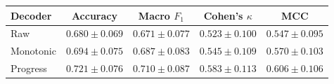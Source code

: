 \begin{tabular}{lcccc}
\toprule
Decoder & Accuracy & Macro $F_1$ & Cohen's $\kappa$ & MCC \\
\midrule
Raw & $0.680 \pm 0.069$ & $0.671 \pm 0.077$ & $0.523 \pm 0.100$ & $0.547 \pm 0.095$ \\
Monotonic & $0.694 \pm 0.075$ & $0.687 \pm 0.083$ & $0.545 \pm 0.109$ & $0.570 \pm 0.103$ \\
Progress & $0.721 \pm 0.076$ & $0.710 \pm 0.087$ & $0.583 \pm 0.113$ & $0.606 \pm 0.106$ \\
\bottomrule
\end{tabular}